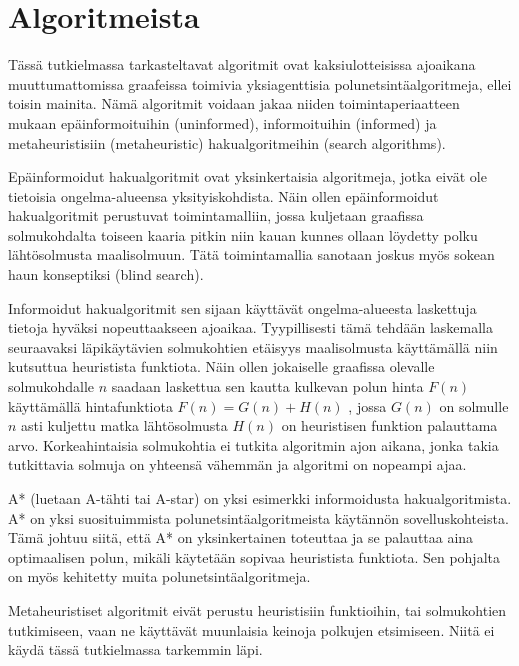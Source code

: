 \section{Algoritmeista}\label{algoritmeista}
Tässä tutkielmassa tarkasteltavat algoritmit ovat kaksiulotteisissa 
ajoaikana muuttumattomissa graafeissa toimivia yksiagenttisia 
polunetsintäalgoritmeja, ellei toisin mainita. Nämä algoritmit voidaan jakaa 
niiden toimintaperiaatteen mukaan epäinformoituihin (uninformed), 
informoituihin (informed) ja metaheuristisiin (metaheuristic) 
hakualgoritmeihin (search algorithms)\cite{applSciLawande}.\par
	Epäinformoidut hakualgoritmit ovat yksinkertaisia algoritmeja, jotka 
eivät ole tietoisia ongelma-alueensa yksityiskohdista. Näin ollen 
epäinformoidut hakualgoritmit perustuvat toimintamalliin, jossa kuljetaan 
graafissa solmukohdalta toiseen kaaria pitkin niin kauan kunnes ollaan 
löydetty polku lähtösolmusta maalisolmuun. Tätä toimintamallia sanotaan 
joskus myös sokean haun konseptiksi (blind search)\cite{applSciLawande}.\par
	Informoidut hakualgoritmit sen sijaan käyttävät ongelma-alueesta 
laskettuja tietoja hyväksi nopeuttaakseen ajoaikaa. Tyypillisesti tämä 
tehdään laskemalla seuraavaksi läpikäytävien solmukohtien etäisyys 
maalisolmusta käyttämällä niin kutsuttua heuristista funktiota. Näin ollen 
jokaiselle graafissa olevalle solmukohdalle $n$ saadaan laskettua sen 
kautta kulkevan polun hinta $F(n)$ käyttämällä hintafunktiota 
$F(n) = G(n) + H(n)$ , jossa $G(n)$ on solmulle $n$ asti kuljettu matka 
lähtösolmusta $H(n)$ on heuristisen funktion palauttama arvo. 
Korkeahintaisia solmukohtia ei tutkita algoritmin ajon aikana, jonka takia tutkittavia solmuja on yhteensä vähemmän ja algoritmi on 
nopeampi ajaa\cite{applSciLawande}.\par
	A* (luetaan A-tähti tai A-star) on yksi esimerkki informoidusta 
hakualgoritmista. A* on yksi suosituimmista polunetsintäalgoritmeista 
käytännön sovelluskohteista. Tämä johtuu siitä, että A* on yksinkertainen 
toteuttaa ja se palauttaa aina optimaalisen polun, mikäli käytetään 
sopivaa heuristista funktiota\cite{MathewAndMalathy}. Sen pohjalta on 
myös kehitetty muita polunetsintäalgoritmeja\cite{applSciLawande}.\par
	Metaheuristiset algoritmit eivät perustu heuristisiin funktioihin, tai 
solmukohtien tutkimiseen, vaan ne käyttävät muunlaisia keinoja polkujen 
etsimiseen\cite{applSciLawande}. Niitä ei käydä tässä tutkielmassa tarkemmin 
läpi.

